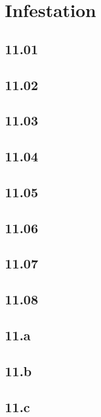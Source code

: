 \part{Infestation}

 \chapter{11.01}

 \chapter{11.02}

 \chapter{11.03}

 \chapter{11.04}

 \chapter{11.05}

 \chapter{11.06}

 \chapter{11.07}

 \chapter{11.08}

 \chapter{11.a}

 \chapter{11.b}

 \chapter{11.c}

